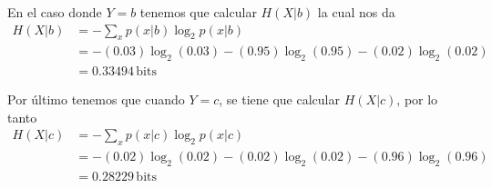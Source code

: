 \begin{enumerate}
\begin{sol}
En el caso donde $Y=b$ tenemos que calcular $H(X| b)$ la cual nos da
    \begin{align*}
    H(X| b) &= - \sum_{x} p(x|b) \log_2 p(x|b) \\
    &= -(0.03) \log_2 (0.03) - (0.95) \log_2 (0.95) - (0.02) \log_2 (0.02) \\
    &=0.33494 \, \text{bits}
    \end{align*}

Por último tenemos que cuando $Y=c$, se tiene que calcular $H(X| c)$, por lo tanto
    \begin{align*}
    H(X|c) &= - \sum_{x} p(x|c) \log_2 p(x|c) \\
    &= -(0.02) \log_2 (0.02) - (0.02) \log_2 (0.02) - (0.96) \log_2 (0.96) \\
    &= 0.28229\, \text{bits}
    \end{align*}


\end{sol}  
\end{enumerate}


